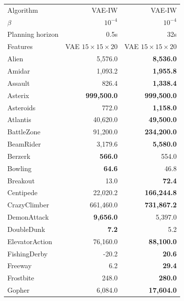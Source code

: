 
\begin{table}[ht]
    \centering
\begin{center}
\begin{small}
\begin{tabular}{lrr}
\toprule
Algorithm & VAE-IW & VAE-IW \\
$\beta$ & $10^{-4}$ & $10^{-4}$\\
Planning horizon & 0.5s & 32s \\
Features &  VAE $15 \times 15 \times 20$ &  VAE $15 \times 15 \times 20$ \\
\midrule


Alien          & 5,576.0            & \textbf{8,536.0}   \\
Amidar         & 1,093.2            & \textbf{1,955.8}   \\
Assault        & 826.4              & \textbf{1,338.4}   \\
Asterix        & \textbf{999,500.0} & \textbf{999,500.0}         \\
Asteroids      & 772.0              & \textbf{1,158.0}   \\
Atlantis       & 40,620.0           & \textbf{49,500.0}  \\
BattleZone     & 91,200.0           & \textbf{234,200.0} \\
BeamRider      & 3,179.6            & \textbf{5,580.0}   \\
Berzerk        & \textbf{566.0}     & 554.0              \\
Bowling        & \textbf{64.6}      & 46.8               \\
Breakout       & 13.0               & \textbf{72.4}      \\
Centipede      & 22,020.2           & \textbf{166,244.8} \\
CrazyClimber   & 661,460.0          & \textbf{731,867.2}  \\
DemonAttack    & \textbf{9,656.0}   & 5,397.0            \\
DoubleDunk     & \textbf{7.2}       & 5.2                \\
ElevatorAction & 76,160.0           & \textbf{88,100.0}     \\
FishingDerby   & -20.2              & \textbf{20.6}      \\
Freeway        & 6.2                & \textbf{29.4}      \\
Frostbite      & 248.0              & \textbf{280.0}     \\
Gopher         & 6,084.0            & \textbf{17,604.0}  \\

\end{tabular}
\end{small}
\end{center}
\end{table}
